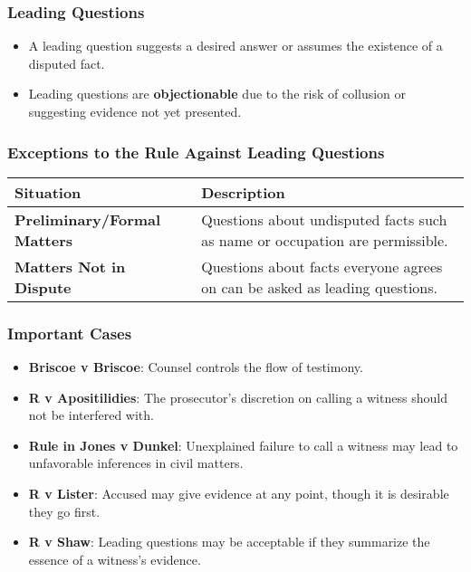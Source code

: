 \subsubsection{Leading Questions}\label{leading-questions}

\begin{itemize}
\tightlist
\item
  A leading question suggests a desired answer or assumes the existence
  of a disputed fact.
\item
  Leading questions are \textbf{objectionable} due to the risk of
  collusion or suggesting evidence not yet presented.
\end{itemize}

\subsubsection{Exceptions to the Rule Against Leading
Questions}\label{exceptions-to-the-rule-against-leading-questions}

\begin{longtable}[]{@{}
  >{\raggedright\arraybackslash}p{}
  >{\raggedright\arraybackslash}p{}@{}}
\toprule\noalign{}
\begin{minipage}[b]{\linewidth}\raggedright
Situation
\end{minipage} & \begin{minipage}[b]{\linewidth}\raggedright
Description
\end{minipage} \\
\midrule\noalign{}
\endhead
\bottomrule\noalign{}
\endlastfoot
\textbf{Preliminary/Formal Matters} & Questions about undisputed facts
such as name or occupation are permissible. \\
\textbf{Matters Not in Dispute} & Questions about facts everyone agrees
on can be asked as leading questions. \\
\end{longtable}

\subsubsection{Important Cases}\label{important-cases-1}

\begin{itemize}
\tightlist
\item
  \textbf{Briscoe v Briscoe}: Counsel controls the flow of testimony.
\item
  \textbf{R v Apositilidies}: The prosecutor's discretion on calling a
  witness should not be interfered with.
\item
  \textbf{Rule in Jones v Dunkel}: Unexplained failure to call a witness
  may lead to unfavorable inferences in civil matters.
\item
  \textbf{R v Lister}: Accused may give evidence at any point, though it
  is desirable they go first.
\item
  \textbf{R v Shaw}: Leading questions may be acceptable if they
  summarize the essence of a witness's evidence.
\end{itemize}

